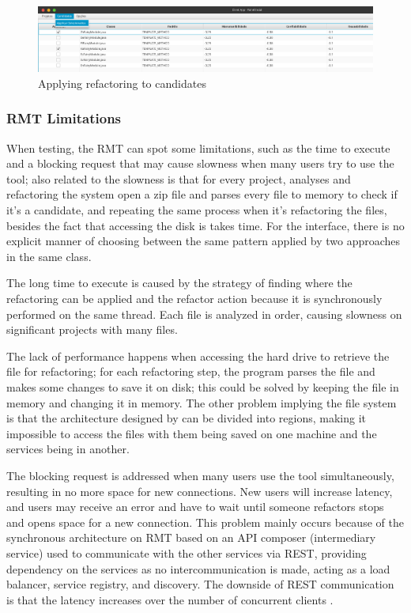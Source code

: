 \begin{figure}[ht!]
\SetCaptionWidth{\textwidth}
\caption{Applying refactoring to candidates}
\label{fig-refactor}
\includegraphics[width =\textwidth]{Chapter-2/Figures/refactor.png}
\end{figure}

\subsubsection{RMT Limitations}
\label{subsub-limitation}
When testing, the RMT can spot some limitations, such as the time to execute and a blocking request that may cause slowness when many users try to use the tool; also related to the slowness is that for every project, analyses and refactoring the system open a zip file and parses every file to memory to check if it's a candidate, and repeating the same process when it's refactoring the files, besides the fact that accessing the disk is takes time. For the interface, there is no explicit manner of choosing between the same pattern applied by two approaches in the same class.

The long time to execute is caused by the strategy of finding where the refactoring can be applied and the refactor action because it is synchronously performed on the same thread. Each file is analyzed in order, causing slowness on significant projects with many files.

The lack of performance happens when accessing the hard drive to retrieve the file for refactoring; for each refactoring step, the program parses the file and makes some changes to save it on disk; this could be solved by keeping the file in memory and changing it in memory.
The other problem implying the file system is that the architecture designed by \textcite{beluzzo2018abordagem} can be divided into regions, making it impossible to access the files with them being saved on one machine and the services being in another.

The blocking request is addressed when many users use the tool simultaneously, resulting in no more space for new connections. New users will increase latency, and users may receive an error and have to wait until someone refactors stops and opens space for a new connection. This problem mainly occurs because of the synchronous architecture on RMT based on an API composer (intermediary service) used to communicate with the other services via REST, providing dependency on the services as no intercommunication is made, acting as a load balancer, service registry, and discovery. The downside of REST communication is that the latency increases over the number of concurrent clients \cite{Cebeci2020DesignOA}. 

